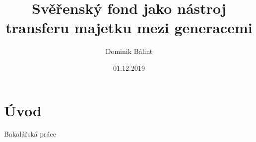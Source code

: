 \documentclass{article}
\title{Svěřenský fond jako nástroj transferu majetku mezi generacemi}
\author{Dominik Bálint}
\date{01.12.2019}
\begin{document}
  \maketitle
  \newpage
  \tableofcontents
  \newpage
  
\section{\textbf{Úvod}} 

Bakalářská práce
	
\end{document}
